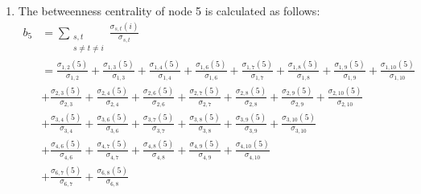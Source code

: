 \documentclass{article}
\begin{document}
\begin{enumerate}[label=(\alph*), left=10pt, itemsep=10pt]
        \item \begin{minipage}[t]{0.9\textwidth}
                The betweenness centrality of node 5 is calculated as follows:
                \begin{align*}
                    b_{5}   &= \sum_{\substack{s,t\\s\neq t\neq i}} \frac{\sigma_{s,t}(i)}{\sigma_{s,t}}\\
                            &= \frac{\sigma_{1,2}(5)}{\sigma_{1,2}}
                               + \frac{\sigma_{1,3}(5)}{\sigma_{1,3}}
                               + \frac{\sigma_{1,4}(5)}{\sigma_{1,4}}
                               + \frac{\sigma_{1,6}(5)}{\sigma_{1,6}}
                               + \frac{\sigma_{1,7}(5)}{\sigma_{1,7}}
                               + \frac{\sigma_{1,8}(5)}{\sigma_{1,8}}
                               + \frac{\sigma_{1,9}(5)}{\sigma_{1,9}}
                               + \frac{\sigma_{1,10}(5)}{\sigma_{1,10}}\\
                            &+   \frac{\sigma_{2,3}(5)}{\sigma_{2,3}}
                               + \frac{\sigma_{2,4}(5)}{\sigma_{2,4}}
                               + \frac{\sigma_{2,6}(5)}{\sigma_{2,6}}
                               + \frac{\sigma_{2,7}(5)}{\sigma_{2,7}}
                               + \frac{\sigma_{2,8}(5)}{\sigma_{2,8}}
                               + \frac{\sigma_{2,9}(5)}{\sigma_{2,9}}
                               + \frac{\sigma_{2,10}(5)}{\sigma_{2,10}}\\
                            &+   \frac{\sigma_{3,4}(5)}{\sigma_{3,4}}
                               + \frac{\sigma_{3,6}(5)}{\sigma_{3,6}}
                               + \frac{\sigma_{3,7}(5)}{\sigma_{3,7}}
                               + \frac{\sigma_{3,8}(5)}{\sigma_{3,8}}
                               + \frac{\sigma_{3,9}(5)}{\sigma_{3,9}}
                               + \frac{\sigma_{3,10}(5)}{\sigma_{3,10}}\\
                            &+   \frac{\sigma_{4,6}(5)}{\sigma_{4,6}}
                               + \frac{\sigma_{4,7}(5)}{\sigma_{4,7}}
                               + \frac{\sigma_{4,8}(5)}{\sigma_{4,8}}
                               + \frac{\sigma_{4,9}(5)}{\sigma_{4,9}}
                               + \frac{\sigma_{4,10}(5)}{\sigma_{4,10}}\\
                            &+   \frac{\sigma_{6,7}(5)}{\sigma_{6,7}}
                               + \frac{\sigma_{6,8}(5)}{\sigma_{6,8}}

\end{align*}
\end{minipage}
\end{enumerate}
\end{document}
